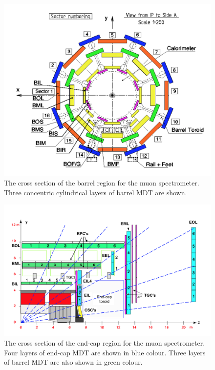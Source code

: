 \begin{figure}
\centering
\includegraphics[width=\textwidth]{data/photo/detector/muon_barrel.png}
\caption{The cross section of the barrel region for the muon spectrometer. Three concentric cylindrical layers of barrel MDT are shown. \cite{ATLAS_doc}}
\label{fig:muon_barrel}
\end{figure}

\begin{figure}
\centering
\includegraphics[width=\textwidth]{data/photo/detector/muon_endcap.png}
\caption{The cross section of the end-cap region for the muon spectrometer. Four layers of end-cap MDT are shown in blue colour. Three layers of barrel MDT are also shown in green colour. \cite{ATLAS_doc}}
\label{fig:muon_endcap}
\end{figure}

